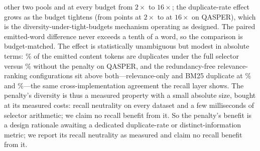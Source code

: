 \documentclass[pdflatex,sn-basic]{sn-jnl}
\theoremstyle{remark}
\begin{document}
other two pools and at every budget from $2\times$ to $16\times$;
the duplicate-rate effect grows as the budget tightens (from
\RedPairQTwoDr{} points at $2\times$ to \RedPairQSixteenDr{} at
$16\times$ on QASPER), which is the diversity-under-tight-budgets
mechanism operating as designed. The paired emitted-word difference
never exceeds a tenth of a word, so the comparison is budget-matched.
The effect is statistically unambiguous but modest in absolute
terms: \RedQSieFourDr\% of the emitted content tokens are duplicates
under the full selector versus \RedQNoRedFourDr\% without the
penalty on QASPER, and the redundancy-free relevance-ranking
configurations sit above both---relevance-only and BM25 duplicate at
\RedQRelOnlyFourDr\% and \RedQBmFourDr\%---the same
cross-implementation agreement the recall layer shows. The penalty's
diversity is thus a measured property with a small absolute size,
bought at its measured costs: recall neutrality on every dataset and
a few milliseconds of selector arithmetic; we claim no recall
benefit from it.
\else
So the penalty's benefit is a design rationale awaiting a dedicated
duplicate-rate or distinct-information metric; we report its recall
neutrality as measured and claim no recall benefit from it.
\fi
\end{document}
